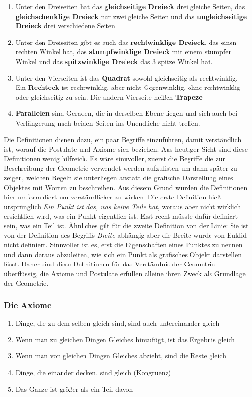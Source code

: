 \begin{enumerate}
	\item Unter den Dreiseiten hat das \textbf{gleichseitige Dreieck} drei gleiche Seiten, das \textbf{gleichschenklige Dreieck} nur zwei gleiche Seiten und das \textbf{ungleichseitige Dreieck} drei verschiedene Seiten
	\item Unter den Dreiseiten gibt es auch das \textbf{rechtwinklige Dreieck}, das einen rechten Winkel hat, das \textbf{stumpfwinklige Dreieck} mit einem stumpfen Winkel und das \textbf{spitzwinklige Dreieck} das 3 spitze Winkel hat.
	\item Unter den Vierseiten ist das \textbf{Quadrat} sowohl gleichseitig als rechtwinklig. Ein \textbf{Rechteck} ist rechtwinklig, aber nicht Gegenwinklig, ohne rechtwinklig oder gleichseitig zu sein. Die andern Vierseite heißen \textbf{Trapeze}
	\item \textbf{Parallelen} sind Geraden, die in derselben Ebene liegen und sich auch bei Verlängerung nach beiden Seiten ins Unendliche nicht treffen.
\end{enumerate}

Die Definitionen dienen dazu, ein paar Begriffe einzuführen, damit verständlich ist, worauf die Postulate und Axiome sich beziehen. Aus heutiger Sicht sind diese Definitionen wenig hilfreich. Es wäre sinnvoller, zuerst die Begriffe die zur Beschreibung der Geometrie verwendet werden aufzulisten um dann später zu zeigen, welchen Regeln sie unterliegen anstatt die grafische Darstellung eines Objektes mit Worten zu beschreiben. Aus diesem Grund wurden die Definitionen hier umformuliert um verständlicher zu wirken. Die erste Definition hieß ursprünglich \textit{\glqq{}Ein Punkt ist das, was keine Teile hat\grqq{}}, woraus aber nicht wirklich ersichtlich wird, was ein Punkt eigentlich ist. Erst recht müsste dafür definiert sein, was ein Teil ist. Ähnliches gilt für die zweite Definition von der Linie: Sie ist von der Definition des Begriffs \textit{Breite} abhängig aber die Breite wurde von Euklid nicht definiert. Sinnvoller ist es, erst die Eigenschaften eines Punktes zu nennen und dann daraus abzuleiten, wie sich ein Punkt als grafisches Objekt darstellen lässt. Daher sind diese Definitionen für das Verständnis der Geometrie überflüssig, die Axiome und Postulate erfüllen alleine ihren Zweck als Grundlage der Geometrie.

\subsubsection{Die Axiome}
\begin{enumerate}
	\item Dinge, die zu dem selben gleich sind, sind auch untereinander gleich
	\item Wenn man zu gleichen Dingen Gleiches hinzufügt, ist das Ergebnis gleich
	\item Wenn man von gleichen Dingen Gleiches abzieht, sind die Reste gleich
	\item Dinge, die einander decken, sind gleich (Kongruenz)
	\item Das Ganze ist größer als ein Teil davon
\end{enumerate}

